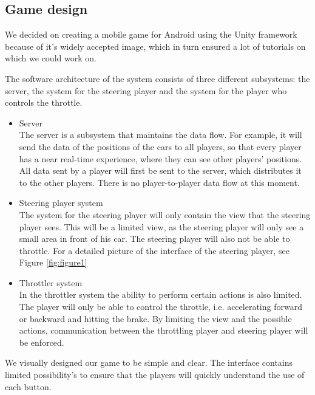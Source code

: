 \documentclass{sigchi}
\begin{document}
\subsection{Game design}

We decided on creating a mobile game for Android using the Unity framework
because of it's widely accepted image, which in turn ensured a lot of tutorials
on which we could work on.

The software architecture of the system consists of three different subsystems: the server, the system for the steering player and the system for the player who controls the throttle.

\begin{itemize}
\item Server \hfill \\
    The server is a subsystem that maintains the data flow. For example, it will send the data of the positions of the cars to all players, so that every player has a near real-time experience, where they can see other players' positions. All data sent by a player will first be sent to the server, which distributes it to the other players. There is no player-to-player data flow at this moment.
\item Steering player system \hfill \\
    The system for the steering player will only contain the view that the steering player sees. This will be a limited view, as the steering player will only see a small area in front of his car. The steering player will also not be able to throttle. For a detailed picture of the interface of the steering player, see Figure \ref{fig:figure1}
\item Throttler system \hfill \\
    In the throttler system the ability to perform certain actions is also limited. The player will only be able to control the throttle, i.e. accelerating forward or backward and hitting the brake. By limiting the view and the possible actions, communication between the throttling player and steering player will be enforced.
\end{itemize}

We visually designed our game to be simple and clear. The interface contains limited possibility's to ensure that the players will quickly understand the use of each button.
\end{document}
